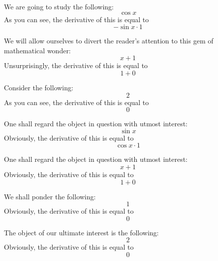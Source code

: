 \documentclass{article}
\begin{document}
We are going to study the following:
\begin{equation}
\cos x 
\end{equation}
As you can see, the derivative of this is equal to
\begin{equation}
-\sin x \cdot 1 
\end{equation}

We will allow ourselves to divert the reader's attention to this gem of mathematical wonder:
\begin{equation}
x + 1 
\end{equation}
Unsurprisingly, the derivative of this is equal to
\begin{equation}
1 + 0 
\end{equation}

Consider the following:
\begin{equation}
2 
\end{equation}
As you can see, the derivative of this is equal to
\begin{equation}
0 
\end{equation}

One shall regard the object in question with utmost interest:
\begin{equation}
\sin x 
\end{equation}
Obviously, the derivative of this is equal to
\begin{equation}
\cos x \cdot 1 
\end{equation}

One shall regard the object in question with utmost interest:
\begin{equation}
x + 1 
\end{equation}
Obviously, the derivative of this is equal to
\begin{equation}
1 + 0 
\end{equation}

We shall ponder the following:
\begin{equation}
1 
\end{equation}
Obviously, the derivative of this is equal to
\begin{equation}
0 
\end{equation}

The object of our ultimate interest is the following:
\begin{equation}
2 
\end{equation}
Obviously, the derivative of this is equal to
\begin{equation}
0 
\end{equation}
\end{document}

